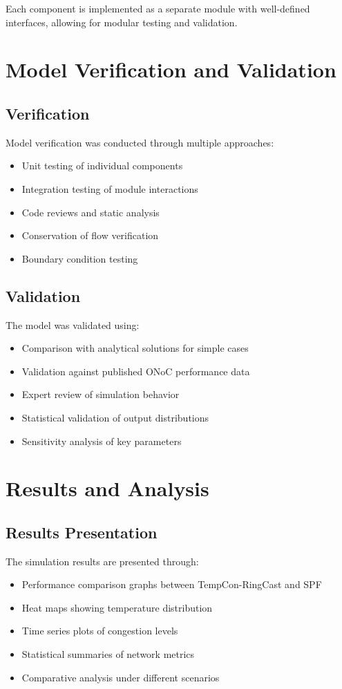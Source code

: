 \documentclass[12pt]{article}
\begin{document}
Each component is implemented as a separate module with well-defined interfaces, allowing for modular testing and validation.

\section{Model Verification and Validation}
\subsection{Verification}
Model verification was conducted through multiple approaches:
\begin{itemize}
    \item Unit testing of individual components
    \item Integration testing of module interactions
    \item Code reviews and static analysis
    \item Conservation of flow verification
    \item Boundary condition testing
\end{itemize}

\subsection{Validation}
The model was validated using:
\begin{itemize}
    \item Comparison with analytical solutions for simple cases
    \item Validation against published ONoC performance data
    \item Expert review of simulation behavior
    \item Statistical validation of output distributions
    \item Sensitivity analysis of key parameters
\end{itemize}

\section{Results and Analysis}
\subsection{Results Presentation}
The simulation results are presented through:
\begin{itemize}
    \item Performance comparison graphs between TempCon-RingCast and SPF
    \item Heat maps showing temperature distribution
    \item Time series plots of congestion levels
    \item Statistical summaries of network metrics
    \item Comparative analysis under different scenarios
\end{itemize}
\end{document}
